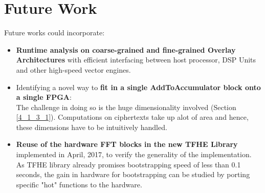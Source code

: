\section{Future Work}
Future works could incorporate:
\begin{itemize}
\item \textbf{Runtime analysis on coarse-grained and fine-grained Overlay Architectures} with efficient interfacing between host processor, DSP Units and other high-speed vector engines.
\item Identifying a novel way to \textbf{fit in a single AddToAccumulator block onto a single FPGA}: \\The challenge in doing so is the huge dimensionality involved (Section \ref{4_1_3_1}). Computations on ciphertexts take up alot of area and hence, these dimensions have to be intuitively handled.
\item \textbf{Reuse of the hardware FFT blocks in the new TFHE Library} implemented in April, 2017, to verify the generality of the implementation. As TFHE library already promises bootstrapping speed of less than 0.1 seconds, the gain in hardware for bootstrapping can be studied by porting specific "hot" functions to the hardware.
\end{itemize}
